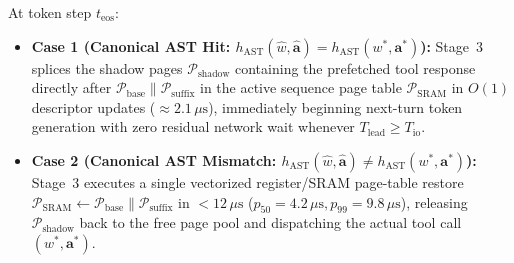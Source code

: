 \documentclass[10pt,conference]{IEEEtran}
\begin{document}
At token step $t_{\text{eos}}$:
\begin{itemize}
    \item \textbf{Case 1 (Canonical AST Hit: $h_{\text{AST}}(\hat{w}, \hat{\mathbf{a}}) = h_{\text{AST}}(w^*, \mathbf{a}^*)$):} Stage~3 splices the shadow pages $\mathcal{P}_{\text{shadow}}$ containing the prefetched tool response directly after $\mathcal{P}_{\text{base}} \parallel \mathcal{P}_{\text{suffix}}$ in the active sequence page table $\mathcal{P}_{\text{SRAM}}$ in $O(1)$ descriptor updates ($\approx 2.1\,\mu\text{s}$), immediately beginning next-turn token generation with zero residual network wait whenever $T_{\text{lead}} \ge T_{\text{io}}$.
    \item \textbf{Case 2 (Canonical AST Mismatch: $h_{\text{AST}}(\hat{w}, \hat{\mathbf{a}}) \neq h_{\text{AST}}(w^*, \mathbf{a}^*)$):} Stage~3 executes a single vectorized register/SRAM page-table restore $\mathcal{P}_{\text{SRAM}} \leftarrow \mathcal{P}_{\text{base}} \parallel \mathcal{P}_{\text{suffix}}$ in $< 12\,\mu\text{s}$ ($p_{50} = 4.2\,\mu\text{s}, p_{99} = 9.8\,\mu\text{s}$), releasing $\mathcal{P}_{\text{shadow}}$ back to the free page pool and dispatching the actual tool call $(w^*, \mathbf{a}^*)$.
\end{itemize}
\end{document}
